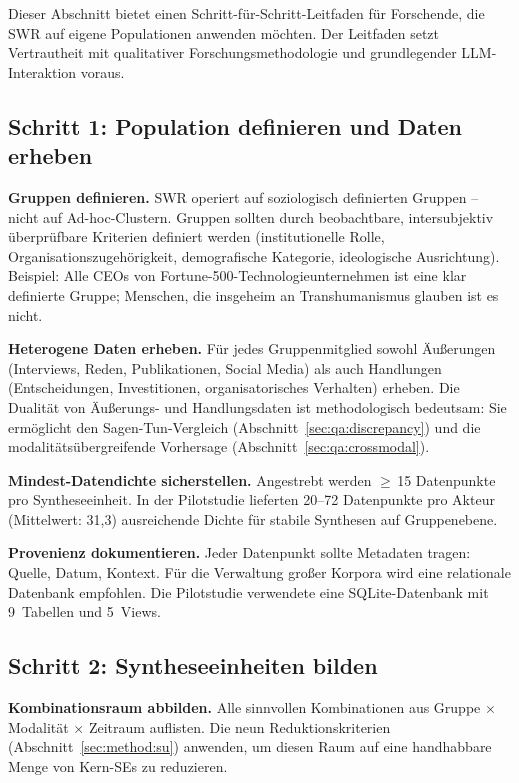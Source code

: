 \documentclass[11pt,a4paper]{article}
\begin{document}
Dieser Abschnitt bietet einen Schritt-f\"ur-Schritt-Leitfaden f\"ur Forschende, die SWR auf eigene Populationen anwenden m\"ochten. Der Leitfaden setzt Vertrautheit mit qualitativer Forschungsmethodologie und grundlegender LLM-Interaktion voraus.

\subsection{Schritt 1: Population definieren und Daten erheben}
\label{sec:app:step1}

\textbf{Gruppen definieren.} SWR operiert auf soziologisch definierten Gruppen -- nicht auf Ad-hoc-Clustern. Gruppen sollten durch beobachtbare, intersubjektiv \"uberpr\"ufbare Kriterien definiert werden (institutionelle Rolle, Organisationszugeh\"origkeit, demografische Kategorie, ideologische Ausrichtung). Beispiel: \glqq{}Alle CEOs von Fortune-500-Technologieunternehmen\grqq{} ist eine klar definierte Gruppe; \glqq{}Menschen, die insgeheim an Transhumanismus glauben\grqq{} ist es nicht.

\textbf{Heterogene Daten erheben.} F\"ur jedes Gruppenmitglied sowohl \"Au\ss{}erungen (Interviews, Reden, Publikationen, Social Media) als auch Handlungen (Entscheidungen, Investitionen, organisatorisches Verhalten) erheben. Die Dualit\"at von \"Au\ss{}erungs- und Handlungsdaten ist methodologisch bedeutsam: Sie erm\"oglicht den Sagen-Tun-Vergleich (Abschnitt~\ref{sec:qa:discrepancy}) und die modalit\"ats\"ubergreifende Vorhersage (Abschnitt~\ref{sec:qa:crossmodal}).

\textbf{Mindest-Datendichte sicherstellen.} Angestrebt werden $\geq$\,15 Datenpunkte pro Syntheseeinheit. In der Pilotstudie lieferten 20--72 Datenpunkte pro Akteur (Mittelwert: 31,3) ausreichende Dichte f\"ur stabile Synthesen auf Gruppenebene.

\textbf{Provenienz dokumentieren.} Jeder Datenpunkt sollte Metadaten tragen: Quelle, Datum, Kontext. F\"ur die Verwaltung gro\ss{}er Korpora wird eine relationale Datenbank empfohlen. Die Pilotstudie verwendete eine SQLite-Datenbank mit 9~Tabellen und 5~Views.

\subsection{Schritt 2: Syntheseeinheiten bilden}
\label{sec:app:step2}

\textbf{Kombinationsraum abbilden.} Alle sinnvollen Kombinationen aus Gruppe $\times$ Modalit\"at $\times$ Zeitraum auflisten. Die neun Reduktionskriterien (Abschnitt~\ref{sec:method:su}) anwenden, um diesen Raum auf eine handhabbare Menge von Kern-SEs zu reduzieren.
\end{document}
